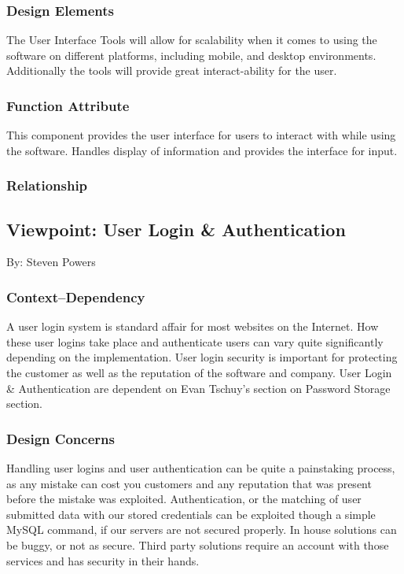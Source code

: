 \documentclass[letterpaper, 10pt, draftclsnofoot, compsoc, onecolumn]{IEEEtran}
\begin{document}
\subsubsection{Design Elements}
{\noindent The User Interface Tools will allow for scalability when it comes to 
using the software on different platforms, including mobile, and desktop environments. 
Additionally the tools will provide great interact-ability for the user.\par}

\subsubsection{Function Attribute}
{\noindent This component provides the user interface for users to interact with while using the software. 
Handles display of information and provides the interface for input.  \par}

\subsubsection{Relationship}


\subsection{Viewpoint: User Login \& Authentication}
{\noindent By: Steven Powers  \par}

\subsubsection{Context--Dependency}
{\noindent A user login system is standard affair for most websites on the Internet. 
How these user logins take place and authenticate users can vary quite 
significantly depending on the implementation. 
User login security is important for protecting the customer as well as 
the reputation of the software and company. User Login \& Authentication 
are dependent on Evan Tschuy's section on Password Storage section. \par}

\subsubsection{Design Concerns}
{\noindent Handling user logins and user authentication can be quite a painstaking process, 
as any mistake can cost you customers and any reputation that was present 
before the mistake was exploited. Authentication, or the matching of user submitted 
data with our stored credentials can be exploited though a simple MySQL command, 
if our servers are not secured properly. In house solutions can be buggy, or not as secure.
Third party solutions require an account with those services and has security in their hands. \par}
\end{document}
